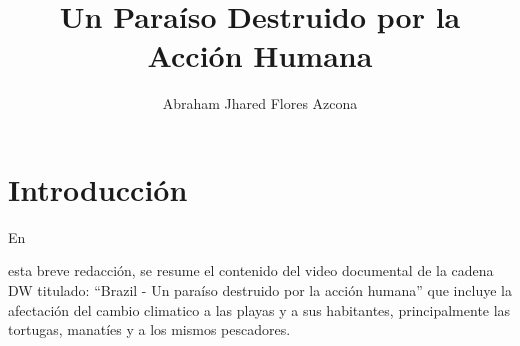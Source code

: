 \documentclass[stu, 12pt, letterpaper, donotrepeattitle, floatsintext, natbib]{apa7}
\title{\Large Un Paraíso Destruido por la Acción Humana}
\author{Abraham Jhared Flores Azcona} %
\affiliation{Instituto Tecnológico de Tijuana}
\begin{document}
\maketitle


\renewcommand\contentsname{Contenido}
\tableofcontents

\newpage
\section{Introducción}
En \begin{justifying}
    esta breve redacción, se resume el contenido del video documental de la cadena DW titulado: ``Brazil - Un paraíso destruido por la acción humana'' que incluye la afectación
    del cambio climatico a las playas y a sus habitantes, principalmente las tortugas, manatíes y a los mismos pescadores.\par
\vspace{\baselineskip}
\end{justifying}
\end{document}
